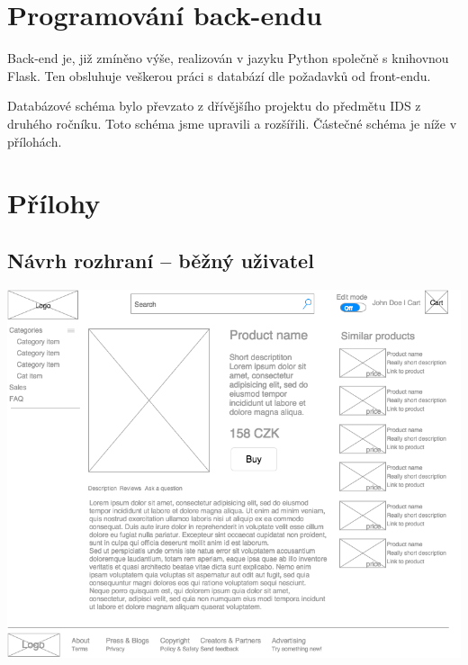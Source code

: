 \documentclass[11pt,a4paper]{article}
\begin{document}
\section*{Programování back-endu}
Back-end je, již zmíněno výše, realizován v jazyku Python společně s knihovnou Flask. Ten obsluhuje veškerou práci s databází dle požadavků od front-endu.

Databázové schéma bylo převzato z dřívějšího projektu do předmětu IDS z druhého ročníku. Toto schéma jsme upravili a rozšířili. Částečné schéma je níže v přílohách.




\section*{Přílohy}

\subsection*{Návrh rozhraní -- běžný uživatel}
\includegraphics[scale=0.6]{pyngshop.png}
\end{document}
